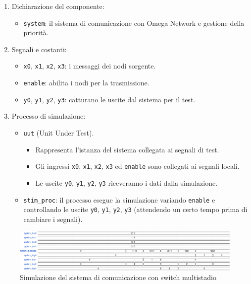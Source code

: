 \begin{enumerate}
    \item Dichiarazione del componente:
    \begin{itemize}
        \item \texttt{system}: il sistema di comunicazione con Omega Network e gestione della priorità.
    \end{itemize}
    \item Segnali e costanti:
    \begin{itemize}
        \item \texttt{x0}, \texttt{x1}, \texttt{x2}, \texttt{x3}: i messaggi dei nodi sorgente.
        \item \texttt{enable}: abilita i nodi per la trasmissione.
        \item \texttt{y0}, \texttt{y1}, \texttt{y2}, \texttt{y3}: catturano le uscite dal sistema per il test.
    \end{itemize}
    \item Processo di simulazione:
    \begin{itemize}
        \item \texttt{uut} (Unit Under Test).
        \begin{itemize}
            \item Rappresenta l'istanza del sistema collegata ai segnali di test.
            \item Gli ingressi \texttt{x0}, \texttt{x1}, \texttt{x2}, \texttt{x3} ed \texttt{enable} sono collegati ai segnali locali.
            \item Le uscite \texttt{y0}, \texttt{y1}, \texttt{y2}, \texttt{y3} riceveranno i dati dalla simulazione.
        \end{itemize}
        \item \texttt{stim\_proc}: il processo esegue la simulazione variando \texttt{enable} e controllando le uscite \texttt{y0}, \texttt{y1}, \texttt{y2}, \texttt{y3} (attendendo un certo tempo prima di cambiare i segnali).
    \end{itemize}
\end{enumerate}

\begin{figure}[h]
    \centering
    \includegraphics[width=\textwidth]{img/omega_network_tb.pdf}
    \caption{Simulazione del sistema di comunicazione con switch multistadio}
    \label{fig:omega_network_tb}
\end{figure}
